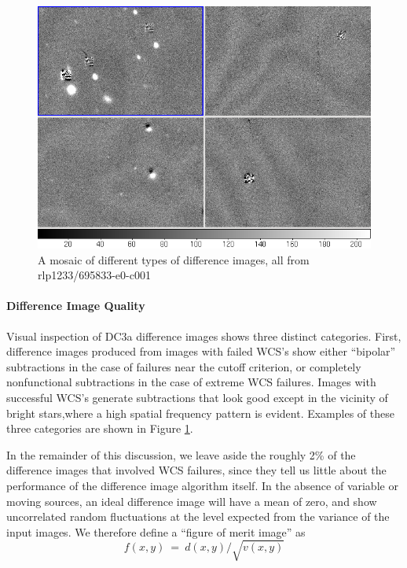 \begin{figure}[htb]
\begin{center}
\includegraphics[width=6in]{images/rlp1233_v695833-e0-c001-mosaic.png}
\caption{A mosaic of different types of difference images, all from rlp1233/695833-e0-c001}  
\label{fig:diffim1}
\end{center}
\end{figure}

\paragraph{Difference Image Quality}

Visual inspection of DC3a difference images shows three distinct
categories. First, difference images produced from images with failed 
WCS's show either ``bipolar'' subtractions in the case of failures
near the cutoff criterion, or completely nonfunctional subtractions in
the case of extreme WCS failures.  Images with successful WCS's
generate subtractions that look good except in the vicinity of bright
stars,where a high spatial frequency pattern is evident.  Examples of
these three categories are shown in Figure \ref{fig:diffim1}.

In the remainder of this discussion, we leave aside the roughly 2\% of
the difference images that involved WCS failures, since they tell us
little about the performance of the difference image algorithm itself.
In the absence of variable or moving sources, an ideal difference
image will have a mean of zero, and show uncorrelated random
fluctuations at the level expected from the variance of the input
images.  We therefore define a ``figure of merit image'' as
\begin{equation}
f(x,y)~=~d(x,y)/\sqrt {v(x,y)}
\end{equation} 

